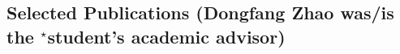 \documentclass[11pt]{scrartcl}
\begin{document}




\subsection{Selected Publications
(Dongfang Zhao was/is the $^\star$student's academic advisor)}
\label{publications}









\end{document}

